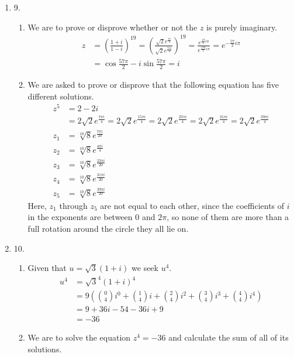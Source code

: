 \documentclass[fleqn]{article}
\newenvironment{answers}{ %
	\begin{enumerate}
		\setlength{\itemsep}{\bigskipamount}
}{\end{enumerate}}
\begin{document}
\begin{answers}
	\item[9.]
		\begin{enumerate}
			\item
				We are to prove or disprove whether or not the \(z\) is purely imaginary.
				\begin{align*}
					z & = \left( \frac{1+i}{1-i} \right)^{19}
					= \left( \frac{\sqrt{2}e^{\frac{i\pi}{4}}}{\sqrt{2}e^{\frac{7i\pi}{4}}} \right)^{19}
					= \frac{e^{\frac{19}{4}i\pi}}{e^{\frac{133}{4}i\pi}}
					= e^{-\frac{57}{2}i\pi} \\
					  & = \cos\frac{57\pi}{2} - i \sin\frac{57\pi}{2} = i
				\end{align*}

			\item
				We are asked to prove or disprove that the following equation has five different solutions.
				\begin{align*}
					z^5 & = 2 - 2i \\
					    & = 2\sqrt{2}e^{\frac{7\pi i}{4}} = 2\sqrt{2}e^{\frac{15\pi i}{4}} = 2\sqrt{2}e^{\frac{23\pi i}{4}} = 2\sqrt{2}e^{\frac{31\pi i}{4}} = 2\sqrt{2}e^{\frac{39\pi i}{4}} \\
					z_1 & = \sqrt[10]{8}e^{\frac{7\pi i}{20}} \\
					z_2 & = \sqrt[10]{8}e^{\frac{4\pi i}{4}} \\
					z_3 & = \sqrt[10]{8}e^{\frac{23\pi i}{20}} \\
					z_4 & = \sqrt[10]{8}e^{\frac{31\pi i}{20}} \\
					z_5 & = \sqrt[10]{8}e^{\frac{39\pi i}{20}}
				\end{align*}
				Here, \(z_1\) through \(z_5\) are not equal to each other, since the coefficients of \(i\) in the exponents are between 0 and \(2\pi\), so none of them are more than a full rotation around the circle they all lie on.
		\end{enumerate}

	\item[10.]
		\begin{enumerate}
			\item
				Given that \(u = \sqrt{3}(1+i)\) we seek \(u^4\).
				\begin{align*}
					u^4 & = \sqrt{3}^4(1+i)^4 \\
					    & = 9\left( \binom{0}{4}i^0 + \binom{1}{4}i + \binom{2}{4}i^2 + \binom{3}{4}i^3 + \binom{4}{4}i^4 \right) \\
					    & = 9 + 36i - 54 - 36i + 9 \\
					    & = -36
				\end{align*}

			\item
				We are to solve the equation \(z^4 = -36\) and calculate the sum of all of its solutions.
				\begin{align*}
					 &
				\end{align*}
		\end{enumerate}
\end{answers}
\end{document}
